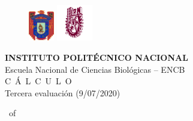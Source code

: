 \documentclass[legalpaper, 12pt]{exam}
\begin{document}
\begin{figure}[t]
\includegraphics[width=0.1\textwidth,height=0.2\textheight,keepaspectratio]{ENCB.png}\hfill
\includegraphics[width=0.14\textwidth,height=0.2\textheight,keepaspectratio]{IPN.pdf}
\end{figure}

\begin{center}
{\vspace*{-3.5cm}\LARGE\textbf{INSTITUTO POLITÉCNICO NACIONAL}} \\\vspace*{0.3cm}
{\Large Escuela Nacional de Ciencias Biológicas -- ENCB}\\\vspace*{0.3cm}
{\huge C\ Á\ L\ C\ U\ L\ O}\\\vspace*{0.3cm}
Tercera evaluación (9/07/2020)

\end{center}
\extraheadheight{-0.5in}
\runningheadrule \extraheadheight{0.1in}
\vspace{0.15in}
\runningheadrule \extraheadheight{0.44in}
              {\thepage\ of \numpages}
              {}
\end{document}
